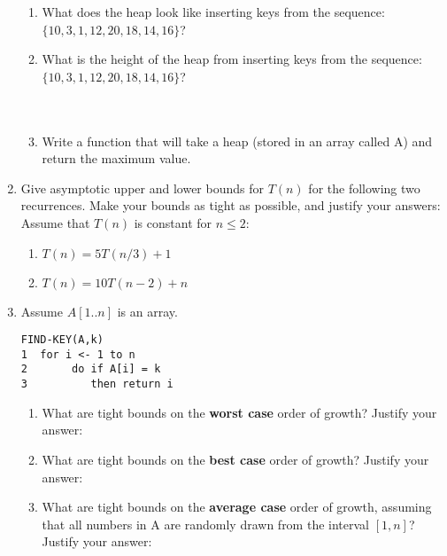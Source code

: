 \begin{enumerate}
    	\begin{enumerate}
		\item What does the heap look like 
			inserting keys from the sequence: $\{10,3,1,12,20,18,14,16\}$?
			\vspace{2in}
		\item What is the height of the heap
				from inserting keys from the sequence: $\{10,3,1,12,20,18,14,16\}$?
				\\ \\
				\ \hfill\underline{\hspace{1in}}
		\item Write a function that will take a heap (stored in an array called A)
			and return the maximum value.
			\vspace{2in}
    	\end{enumerate}
\newpage
	\item Give asymptotic upper and lower bounds for $T(n)$ for the 
		following two recurrences.  Make your bounds as tight as possible,
		and justify your answers:\\
		Assume that $T(n)$ is constant for $n\leq 2$:
		\begin{enumerate}
			\item $T(n) = 5T(n/3) + 1$		
				\vspace{2in}
			\item $T(n) = 10T(n-2) + n$
				\vspace{2in}
		\end{enumerate}

\newpage    	
	\item Assume $A[1..n]$ is an array.  
\begin{verbatim}
FIND-KEY(A,k)
1  for i <- 1 to n
2       do if A[i] = k
3          then return i
\end{verbatim}
		\begin{enumerate}
			\item What are tight bounds on the {\bf worst case} order of growth?
				Justify your answer:
				\vspace{1.5in}
			\item What are tight bounds on the {\bf best case} order of growth?
				Justify your answer:
				\vspace{1.5in}
			\item What are tight bounds on the {\bf average case} order of growth,
				assuming that all numbers in A are randomly drawn from the 
				interval $[1,n]$?
				Justify your answer:
				\vspace{1.5in}
		\end{enumerate}
\newpage


\end{enumerate}
